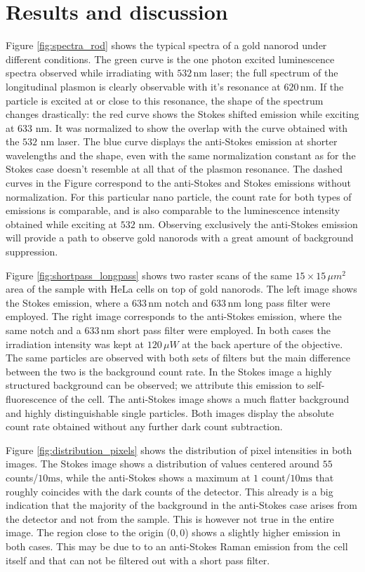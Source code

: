 \documentclass[journal=nalefd,manuscript=letter]{achemso}
\newcommand{\nm}{\ensuremath{\,\textrm{nm}}}
\begin{document}
\section{Results and discussion}
Figure \ref{fig:spectra_rod} shows the typical spectra of a gold nanorod under
different conditions. The green curve is the one photon excited luminescence
spectra observed while irradiating with $532\nm$ laser; the full spectrum of the
longitudinal plasmon is clearly observable with it's resonance at $620\nm$. If
the particle is excited at or close to this resonance, the shape of the spectrum
changes drastically: the red curve shows the Stokes shifted emission while
exciting at $633\,\nm$. It was normalized to show the overlap with the curve
obtained with the $532\,\nm$ laser. The blue curve displays the anti-Stokes
emission at shorter wavelengths and the shape, even with the same normalization
constant as for the Stokes case doesn't resemble at all that of the plasmon
resonance. The dashed curves in the Figure correspond to the anti-Stokes and
Stokes emissions without normalization. For this particular nano particle, the
count rate for both types of emissions is comparable, and is also comparable to
the luminescence intensity obtained while exciting at $532\,\nm$. Observing
exclusively the anti-Stokes emission will provide a path to observe gold
nanorods with a great amount of background suppression. 

Figure \ref{fig:shortpass_longpass} shows two raster scans of the same
$15\times15\,\mu m^2$ area of the sample with HeLa cells on top of gold
nanorods. The left image shows the Stokes emission, where a $633\nm$ notch and
$633\nm$ long pass filter were employed. The right image corresponds to the
anti-Stokes emission, where the same notch and a $633\nm$ short pass filter were
employed. In both cases the irradiation intensity was kept at $120\,\mu W$ at
the back aperture of the objective. The same particles are observed with both sets
of filters but the main difference between the two is the background count rate.
In the Stokes image a highly structured background can be observed; we
attribute this emission to self-fluorescence of the cell. The anti-Stokes
image shows a much flatter background and highly distinguishable single
particles. Both images display the absolute count rate obtained without any
further dark count subtraction. 

Figure \ref{fig:distribution_pixels} shows the distribution of pixel intensities
in both images. The Stokes image shows a distribution of values centered around
$55$ counts/$10\textrm{ms}$, while the anti-Stokes shows a maximum at $1$
count/$10\textrm{ms}$ that roughly coincides with the dark counts of the
detector. This already is a big indication that the majority of the background
in the anti-Stokes case arises from the detector and not from the sample. This
is however not true in the entire image. The region close to the origin ($0,0$)
shows a slightly higher emission in both cases. This may be due to to an
anti-Stokes Raman emission from the cell itself and that can not be filtered out
with a short pass filter.
\end{document}
